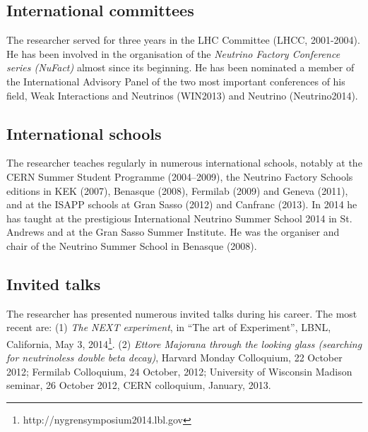 \documentclass[a4paper,11pt,oneside]{article}
\begin{document}
\subsection{International committees}
%
The researcher served for three years in the LHC Committee (LHCC, 2001-2004). He has been involved in the organisation of the \textit{Neutrino Factory Conference series (NuFact)} almost since its beginning. He has been nominated a member of the International Advisory Panel of the two most important conferences of his field, Weak Interactions and Neutrinos (WIN2013) and Neutrino (Neutrino2014). 

\subsection{International schools}
The researcher teaches regularly in numerous international schools, notably at the CERN Summer Student Programme (2004--2009), the 
Neutrino Factory Schools editions in KEK (2007), Benasque (2008), Fermilab (2009) and Geneva (2011), and at the ISAPP schools at
Gran Sasso (2012) and Canfranc (2013). In 2014 he has taught at the prestigious International Neutrino Summer School 2014 in St. Andrews and at the Gran Sasso Summer Institute. He was the organiser and chair of the Neutrino Summer School in Benasque (2008).

\subsection{Invited talks}
The researcher has presented numerous invited talks during his career. The most recent are: 
(1) {\em The NEXT experiment}, in ``The art of Experiment'', LBNL, California, May 3, 2014\footnote{http://nygrensymposium2014.lbl.gov}. 
(2) \textit{Ettore Majorana through the looking glass (searching for neutrinoless double beta decay)}, Harvard Monday Colloquium, 22 October 2012; Fermilab Colloquium, 24 October, 2012; University of Wisconsin Madison seminar, 26 October 2012, CERN colloquium, January, 2013.
\end{document}
